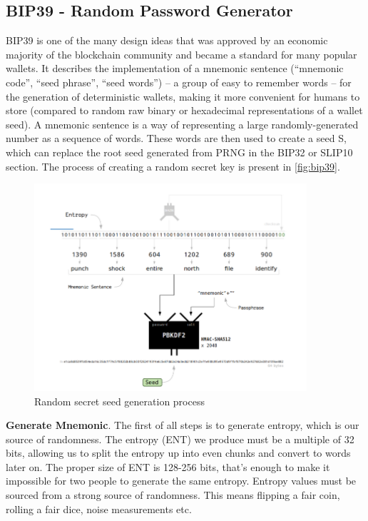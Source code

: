 \subsection{BIP39 - Random Password Generator}
\label{bip39}
BIP39 is one of the many design ideas that was approved by an economic majority of the blockchain community and became a standard for many popular wallets. It describes the implementation of a mnemonic sentence (“mnemonic code”, “seed phrase”, “seed words”) -- a group of easy to remember words -- for the generation of deterministic wallets, making it more convenient for humans to store (compared to random raw binary or hexadecimal representations of a wallet seed). A mnemonic sentence is a way of representing a large randomly-generated number as a sequence of words. These words are then used to create a seed S, which can replace the root seed generated from PRNG in the BIP32 or SLIP10 section. The process of creating a random secret key is present in \autoref{fig:bip39}.

\begin{figure}[ht!]
    \centering
    \includegraphics[width=0.9\textwidth]{images/bip39.png}
    \caption[Random secret seed generation process]{Random secret seed generation process \cite{learnme}}
    \label{fig:bip39}
\end{figure}

\bigskip
{\textbf{Generate Mnemonic}}. The first of all steps is to generate entropy, which is our source of randomness. The entropy (ENT) we produce must be a multiple of 32 bits, allowing us to split the entropy up into even chunks and convert to words later on.
The proper size of ENT is 128-256 bits, that’s enough to make it impossible for two people to generate the same entropy.
Entropy values must be sourced from a strong source of randomness. This means flipping a fair coin, rolling a fair dice, noise measurements etc.

